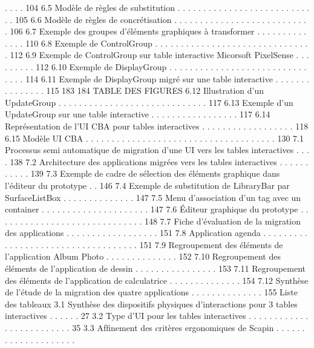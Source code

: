 \documentclass{article}
\begin{document}
. . . .
104
6.5
Mod\`{e}le de r\`{e}gles de substitution . . . . . . . . . . . . . . . . . . . . . . . . . . . .
105
6.6
Mod\`{e}le de r\`{e}gles de concr\'{e}tisation . . . . . . . . . . . . . . . . . . . . . . . . . . .
106
6.7
Exemple des groupes d’\'{e}l\'{e}ments graphiques \`{a} transformer
. . . . . . . . . . . . . .
110
6.8
Exemple de ControlGroup
. . . . . . . . . . . . . . . . . . . . . . . . . . . . . . .
112
6.9
Exemple de ControlGroup sur table interactive Micorsoft PixelSense . . . . . . . . .
112
6.10 Exemple de DisplayGroup
. . . . . . . . . . . . . . . . . . . . . . . . . . . . . . .
114
6.11 Exemple de DisplayGroup migr\'{e} sur une table interactive . . . . . . . . . . . . . . .
115
183
184
TABLE DES FIGURES
6.12 Illustration d’un UpdateGroup . . . . . . . . . . . . . . . . . . . . . . . . . . . . .
117
6.13 Exemple d’un UpdateGroup sur une table interactive
. . . . . . . . . . . . . . . . .
117
6.14 Repr\'{e}sentation de l’UI CBA pour tables interactives . . . . . . . . . . . . . . . . . .
118
6.15 Mod\`{e}le UI CBA . . . . . . . . . . . . . . . . . . . . . . . . . . . . . . . . . . . . .
130
7.1
Processus semi automatique de migration d’une UI vers les tables interactives . . . .
138
7.2
Architecture des applications migr\'{e}es vers les tables interactives . . . . . . . . . . .
139
7.3
Exemple de cadre de s\'{e}lection des \'{e}l\'{e}ments graphique dans l’\'{e}diteur du prototype . .
146
7.4
Exemple de substitution de LibraryBar par SurfaceListBox . . . . . . . . . . . . . .
147
7.5
Menu d’association d’un tag avec un container . . . . . . . . . . . . . . . . . . . . .
147
7.6
Éditeur graphique du prototype . . . . . . . . . . . . . . . . . . . . . . . . . . . . .
148
7.7
Fiche d’\'{e}valuation de la migration des applications
. . . . . . . . . . . . . . . . . .
151
7.8
Application agenda . . . . . . . . . . . . . . . . . . . . . . . . . . . . . . . . . . .
151
7.9
Regroupement des \'{e}l\'{e}ments de l’application Album Photo
. . . . . . . . . . . . . .
152
7.10 Regroupement des \'{e}l\'{e}ments de l’application de dessin
. . . . . . . . . . . . . . . .
153
7.11 Regroupement des \'{e}l\'{e}ments de l’application de calculatrice . . . . . . . . . . . . . .
154
7.12 Synth\`{e}se de l’\'{e}tude de la migration des quatre applications . . . . . . . . . . . . . .
155
Liste des tableaux
3.1
Synth\`{e}se des dispositifs physiques d’interactions pour 3 tables interactives . . . . . .
27
3.2
Type d’UI pour les tables interactives
. . . . . . . . . . . . . . . . . . . . . . . . .
35
3.3
Afﬁnement des crit\`{e}res ergonomiques de Scapin . . . . . . . . . . . . . . . . . . . .
\end{document}
